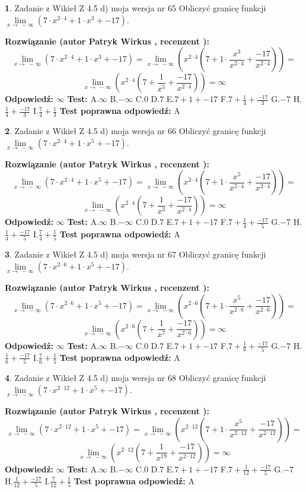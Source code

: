 \documentclass[12pt, a4paper]{article}
\theoremstyle{definition} %
\newtheorem{zad}{}
\newcommand{\zadStart}[1]{\begin{zad}#1\newline}
\newcommand{\zadStop}{\end{zad}}
\newcommand{\rozwStart}[2]{\noindent \textbf{Rozwiązanie (autor #1 , recenzent #2): }\newline}
\newcommand{\rozwStop}{\newline}
\newcommand{\odpStart}{\noindent \textbf{Odpowiedź:}\newline}
\newcommand{\odpStop}{\newline}
\newcommand{\testStart}{\noindent \textbf{Test:}\newline}
\newcommand{\testStop}{\newline}
\newcommand{\kluczStart}{\noindent \textbf{Test poprawna odpowiedź:}\newline}
\newcommand{\kluczStop}{\newline}
\begin{document}
\zadStart{Zadanie z Wikieł Z 4.5 d) moja wersja nr 65}
Obliczyć granicę funkcji  $\lim\limits_{x\to\ -\infty}(7 \cdot x^{2\cdot4}+1 \cdot x^{3}+-17)$.
\zadStop
\rozwStart{Patryk Wirkus}{}
$$\lim\limits_{x\to\ -\infty}(7 \cdot x^{2\cdot4}+1 \cdot x^{3}+-17) = \lim\limits_{x\to\ -\infty}(x^{2\cdot4}(7 +1 \cdot \frac{x^{3}}{x^{2\cdot4}}+\frac{-17}{x^{2\cdot4}})) =$$ $$\lim\limits_{x\to\ -\infty}(x^{2\cdot4}(7 +\frac{1}{x^{5}}+\frac{-17}{x^{2\cdot4}})) =\infty$$
\rozwStop
\odpStart
$\infty$
\odpStop
\testStart
A.$\infty$ B.$-\infty$ C.$0$ D.$7$ E.$7 + 1 + -17$
F.$7+\frac{1}{4}+\frac{-17}{3}$ G.$-7$
H.$\frac{1}{4}+\frac{-17}{3}$
I.$\frac{7}{4}+\frac{1}{3}$
\testStop
\kluczStart
A
\kluczStop



\zadStart{Zadanie z Wikieł Z 4.5 d) moja wersja nr 66}
Obliczyć granicę funkcji  $\lim\limits_{x\to\ -\infty}(7 \cdot x^{2\cdot4}+1 \cdot x^{5}+-17)$.
\zadStop
\rozwStart{Patryk Wirkus}{}
$$\lim\limits_{x\to\ -\infty}(7 \cdot x^{2\cdot4}+1 \cdot x^{5}+-17) = \lim\limits_{x\to\ -\infty}(x^{2\cdot4}(7 +1 \cdot \frac{x^{5}}{x^{2\cdot4}}+\frac{-17}{x^{2\cdot4}})) =$$ $$\lim\limits_{x\to\ -\infty}(x^{2\cdot4}(7 +\frac{1}{x^{3}}+\frac{-17}{x^{2\cdot4}})) =\infty$$
\rozwStop
\odpStart
$\infty$
\odpStop
\testStart
A.$\infty$ B.$-\infty$ C.$0$ D.$7$ E.$7 + 1 + -17$
F.$7+\frac{1}{4}+\frac{-17}{5}$ G.$-7$
H.$\frac{1}{4}+\frac{-17}{5}$
I.$\frac{7}{4}+\frac{1}{5}$
\testStop
\kluczStart
A
\kluczStop



\zadStart{Zadanie z Wikieł Z 4.5 d) moja wersja nr 67}
Obliczyć granicę funkcji  $\lim\limits_{x\to\ -\infty}(7 \cdot x^{2\cdot6}+1 \cdot x^{5}+-17)$.
\zadStop
\rozwStart{Patryk Wirkus}{}
$$\lim\limits_{x\to\ -\infty}(7 \cdot x^{2\cdot6}+1 \cdot x^{5}+-17) = \lim\limits_{x\to\ -\infty}(x^{2\cdot6}(7 +1 \cdot \frac{x^{5}}{x^{2\cdot6}}+\frac{-17}{x^{2\cdot6}})) =$$ $$\lim\limits_{x\to\ -\infty}(x^{2\cdot6}(7 +\frac{1}{x^{7}}+\frac{-17}{x^{2\cdot6}})) =\infty$$
\rozwStop
\odpStart
$\infty$
\odpStop
\testStart
A.$\infty$ B.$-\infty$ C.$0$ D.$7$ E.$7 + 1 + -17$
F.$7+\frac{1}{6}+\frac{-17}{5}$ G.$-7$
H.$\frac{1}{6}+\frac{-17}{5}$
I.$\frac{7}{6}+\frac{1}{5}$
\testStop
\kluczStart
A
\kluczStop



\zadStart{Zadanie z Wikieł Z 4.5 d) moja wersja nr 68}
Obliczyć granicę funkcji  $\lim\limits_{x\to\ -\infty}(7 \cdot x^{2\cdot12}+1 \cdot x^{5}+-17)$.
\zadStop
\rozwStart{Patryk Wirkus}{}
$$\lim\limits_{x\to\ -\infty}(7 \cdot x^{2\cdot12}+1 \cdot x^{5}+-17) = \lim\limits_{x\to\ -\infty}(x^{2\cdot12}(7 +1 \cdot \frac{x^{5}}{x^{2\cdot12}}+\frac{-17}{x^{2\cdot12}})) =$$ $$\lim\limits_{x\to\ -\infty}(x^{2\cdot12}(7 +\frac{1}{x^{19}}+\frac{-17}{x^{2\cdot12}})) =\infty$$
\rozwStop
\odpStart
$\infty$
\odpStop
\testStart
A.$\infty$ B.$-\infty$ C.$0$ D.$7$ E.$7 + 1 + -17$
F.$7+\frac{1}{12}+\frac{-17}{5}$ G.$-7$
H.$\frac{1}{12}+\frac{-17}{5}$
I.$\frac{7}{12}+\frac{1}{5}$
\testStop
\kluczStart
A
\kluczStop
\end{document}
